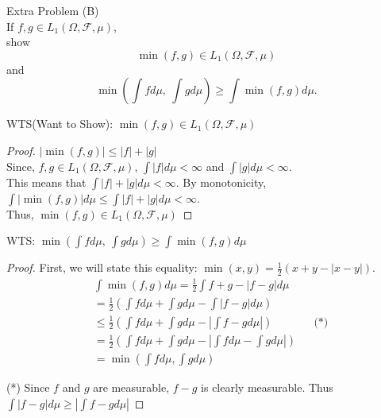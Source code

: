 \documentclass[12pt,letterpaper, onecolumn]{exam}
\newcommand{\calF}{\mathcal{F}}
\newcommand{\dm}{d \mu}
\begin{document}
\begin{questions}
    \question Extra Problem (B) \\
    If $f, g \in L_1(\Omega, \calF, \mu)$, \\
    show 
    \[\min(f, g) \in L_1(\Omega, \calF, \mu)\]
    and 
    \[\min\left(\int fd\mu, \: \int g d\mu\right) \geq \int \min(f,g)d\mu.\]
    \begin{solution}
        WTS(Want to Show): $\min(f, g) \in L_1(\Omega, \calF, \mu)$
        \begin{proof}
            $|\min(f, g)| \leq |f| + |g|$ \\
            Since, $f, g \in L_1(\Omega, \calF, \mu)$, $\int |f| d \mu < \infty$ and $\int |g| d \mu < \infty$. \\ This means that $\int |f| + |g| d \mu < \infty$. 
            By monotonicity, $\int |\min(f, g)| d \mu \leq \int |f| + |g| d \mu < \infty$. \\ Thus, $\min(f, g) \in L_1(\Omega, \calF, \mu)$
        \end{proof}

        WTS: $\min\left(\int fd\mu, \: \int g d\mu\right) \geq \int \min(f,g)d\mu$
        \begin{proof}
            First, we will state this equality: $\min(x, y) = \frac{1}{2}(x + y - |x - y|)$. 
            \begin{align*}
                & \int \min(f, g) \dm = \frac{1}{2}\int f + g - |f - g| \dm \\
                & = \frac{1}{2}\left(\int f\dm + \int g \dm - \int |f - g| \dm \right) \\
                & \leq \frac{1}{2}\left(\int f\dm + \int g \dm - \left|\int f - g \dm\right|\right) && \textrm{(*)}\\
                & = \frac{1}{2}\left(\int f\dm + \int g \dm - \left|\int f \dm - \int g \dm\right|\right) \\
                & = \min\left(\int f \dm, \int g \dm \right)
            \end{align*}

            (*) Since $f$ and $g$ are measurable, $f - g$ is clearly measurable. Thus $\int|f - g| \dm \geq \left|\int f - g \dm \right |$
        \end{proof}
    \end{solution}

\end{questions}
\end{document}
